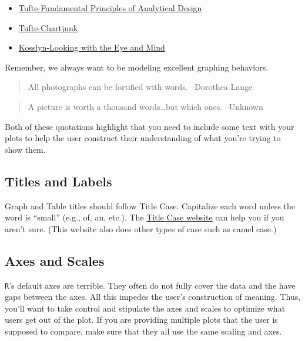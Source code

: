 \documentclass[
]{book}
\providecommand{\tightlist}{%
  \setlength{\itemsep}{0pt}\setlength{\parskip}{0pt}}
\begin{document}
\begin{itemize}
\tightlist
\item
  \href{https://www.dropbox.com/s/hb52991v09p8q91/Tufte\%20-\%202006\%20-\%20The\%20Fundamental\%20principles\%20of\%20analytical\%20design.pdf?dl=0}{Tufte-Fundamental Principles of Analytical Design}
\item
  \href{https://www.dropbox.com/s/z8yrf4eqph6c2h4/Tufte\%20-\%202001\%20-\%20Chartjunk\%20Vibrations\%2C\%20grids\%2C\%20and\%20ducks.pdf?dl=0}{Tufte-Chartjunk}\\
\item
  \href{https://www.dropbox.com/s/62uegsribwdjtze/Kosslyn\%20-\%202006\%20-\%20Looking\%20with\%20the\%20eye\%20and\%20mind.pdf?dl=0}{Kosslyn-Looking with the Eye and Mind}
\end{itemize}

Remember, we always want to be modeling excellent graphing behaviors.

\begin{quote}
All photographs can be fortified with words. --Dorothea Lange
\end{quote}

\begin{quote}
A picture is worth a thousand words\ldots but which ones. --Unknown
\end{quote}

Both of these quotations highlight that you need to include some text with your plots to help the user construct their understanding of what you're trying to show them.

\hypertarget{titles-and-labels}{%
\subsection{Titles and Labels}\label{titles-and-labels}}

Graph and Table titles should follow Title Case. Capitalize each word unless the word is ``small'' (e.g., of, an, etc.). The \href{https://titlecase.com/}{Title Case website} can help you if you aren't sure. (This website also does other types of case such as camel case.)

\hypertarget{axes-and-scales}{%
\subsection{Axes and Scales}\label{axes-and-scales}}

\texttt{R}'s default axes are terrible. They often do not fully cover the data and the have gaps between the axes. All this impedes the user's construction of meaning. Thus, you'll want to take control and stipulate the axes and scales to optimize what users get out of the plot. If you are providing multiple plots that the user is supposed to compare, make sure that they all use the same scaling and axes.
\end{document}
